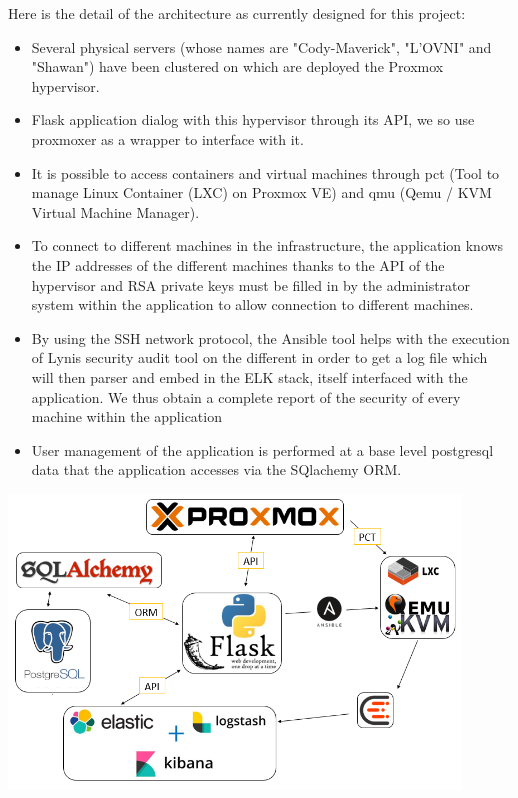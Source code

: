 Here is the detail of the architecture as currently designed for this project:
\begin{itemize}
\item
  Several physical servers (whose names are "Cody-Maverick", "L'OVNI" and
  "Shawan") have been clustered on which are deployed the Proxmox hypervisor.
\item
  Flask application dialog with this hypervisor through its API, we
  so use proxmoxer as a wrapper to interface with
  it.
\item
  It is possible to access containers and virtual machines through
  pct (Tool to manage Linux Container (LXC) on Proxmox VE) and
  qmu (Qemu / KVM Virtual Machine Manager).
\item
  To connect to different machines in the infrastructure, the application
  knows the IP addresses of the different machines thanks to the API of
  the hypervisor and RSA private keys must be filled in by the administrator
  system within the application to allow connection to
  different machines.
\item
  By using the SSH network protocol, the Ansible tool helps with the execution of
  Lynis security audit tool on the different in order to get a
  log file which will then parser and embed in the ELK stack, itself
  interfaced with the application. We thus obtain a complete report of the
  security of every machine within the application
\item
  User management of the application is performed at a base level
  postgresql data that the application accesses via the SQlachemy ORM.
\end{itemize}


\vspace{1cm}
\begin{center}
\includegraphics[width=0.90\textwidth]{images/schema.png}
\end{center}

